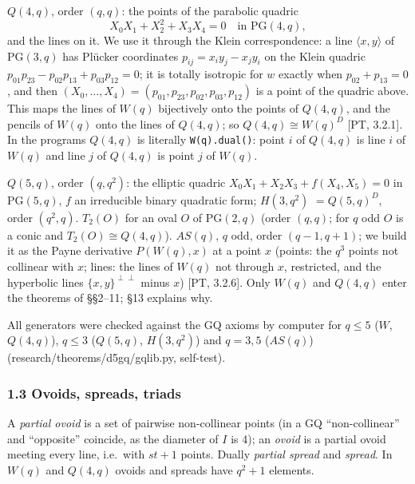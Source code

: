 \documentclass[
  11pt,
]{article}
\begin{document}
\textbf{\(Q(4,q)\)}, order \((q,q)\): the points of the parabolic
quadric \[X_0X_1 + X_2^2 + X_3X_4 = 0\quad\text{in }\mathrm{PG}(4,q),\]
and the lines on it. We use it through the Klein correspondence: a line
\(\langle x,y\rangle\) of \(\mathrm{PG}(3,q)\) has Plücker coordinates
\(p_{ij} = x_iy_j-x_jy_i\) on the Klein quadric
\(p_{01}p_{23}-p_{02}p_{13}+p_{03}p_{12} = 0\); it is totally isotropic
for \(w\) exactly when \(p_{02}+p_{13} = 0\), and then
\((X_0,\dots,X_4) = (p_{01},p_{23},p_{02},p_{03},p_{12})\) is a point of
the quadric above. This maps the lines of \(W(q)\) bijectively onto the
points of \(Q(4,q)\), and the pencils of \(W(q)\) onto the lines of
\(Q(4,q)\); so \(Q(4,q)\cong W(q)^D\) {[}PT, 3.2.1{]}. In the programs
\(Q(4,q)\) is literally \texttt{W(q).dual()}: point \(i\) of \(Q(4,q)\)
is line \(i\) of \(W(q)\) and line \(j\) of \(Q(4,q)\) is point \(j\) of
\(W(q)\).

\textbf{\(Q(5,q)\)}, order \((q,q^2)\): the elliptic quadric
\(X_0X_1+X_2X_3+f(X_4,X_5) = 0\) in \(\mathrm{PG}(5,q)\), \(f\) an
irreducible binary quadratic form; \textbf{\(H(3,q^2)\)} \(= Q(5,q)^D\),
order \((q^2,q)\). \textbf{\(T_2(O)\)} for an oval \(O\) of
\(\mathrm{PG}(2,q)\) (order \((q,q)\); for \(q\) odd \(O\) is a conic
and \(T_2(O)\cong Q(4,q)\)). \textbf{\(AS(q)\)}, \(q\) odd, order
\((q-1,q+1)\); we build it as the Payne derivative \(P(W(q),x)\) at a
point \(x\) (points: the \(q^3\) points not collinear with \(x\); lines:
the lines of \(W(q)\) not through \(x\), restricted, and the hyperbolic
lines \(\{x,y\}^{\perp\perp}\) minus \(x\)) {[}PT, 3.2.6{]}. Only
\(W(q)\) and \(Q(4,q)\) enter the theorems of §§2--11; §13 explains why.

All generators were checked against the GQ axioms by computer for
\(q\le 5\) (\(W\), \(Q(4,q)\)), \(q\le 3\) (\(Q(5,q)\), \(H(3,q^2)\))
and \(q = 3,5\) (\(AS(q)\)) (research/theorems/d5gq/gqlib.py,
self-test).

\hypertarget{ovoids-spreads-triads}{%
\subsubsection{1.3 Ovoids, spreads,
triads}\label{ovoids-spreads-triads}}

A \emph{partial ovoid} is a set of pairwise non-collinear points (in a
GQ ``non-collinear'' and ``opposite'' coincide, as the diameter of \(I\)
is 4); an \emph{ovoid} is a partial ovoid meeting every line, i.e.~with
\(st+1\) points. Dually \emph{partial spread} and \emph{spread}. In
\(W(q)\) and \(Q(4,q)\) ovoids and spreads have \(q^2+1\) elements.
\end{document}
